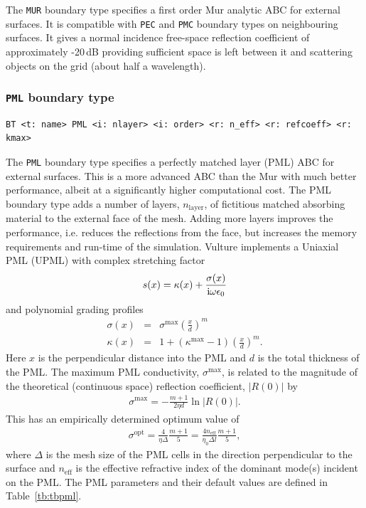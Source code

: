 \documentclass[onecolumn,a4paper]{article}
\numberwithin{equation}{section}
\begin{document}
The \texttt{MUR} boundary type specifies a first order Mur analytic ABC for external surfaces. It is compatible
with \texttt{PEC} and \texttt{PMC} boundary types on neighbouring surfaces. It gives a normal incidence 
free-space reflection coefficient of approximately -20\,dB providing sufficient space is left between
it and scattering objects on the grid (about half a wavelength).

\subsubsection{\texttt{PML} boundary type}

\begin{verbatim}
BT <t: name> PML <i: nlayer> <i: order> <r: n_eff> <r: refcoeff> <r: kmax>
\end{verbatim}

The \texttt{PML} boundary type specifies a perfectly matched layer (PML) ABC for external surfaces.
This is a more advanced ABC than the Mur with much better performance, albeit at a significantly 
higher computational cost. The PML boundary
type adds a number of layers, $n_\mathrm{layer}$, of fictitious matched absorbing material to the 
external face of the mesh. Adding more layers improves the performance, i.e. reduces the 
reflections from the face, but increases the memory requirements and run-time of the simulation.  
Vulture implements a Uniaxial PML (UPML) with complex stretching factor~\cite{vultimp}
\begin{eqnarray}
s(x) = \kappa(x) + \frac{\sigma (x)}{\mathrm{i} \omega \epsilon_0}
\end{eqnarray}
and polynomial grading profiles
\begin{eqnarray}
\sigma(x) &=& \sigma^{\mathrm{max}} \left(\frac{x}{d}\right)^m \\
\kappa(x) &=& 1 + (\kappa^{\mathrm{max}}-1) \left( \frac{x}{d} \right)^m.
\end{eqnarray}
Here $x$ is the perpendicular distance into the PML and $d$ is the total thickness of
the PML. The maximum PML conductivity, $\sigma^{\mathrm{max}}$, is related to the magnitude of
the theoretical (continuous space) reflection coefficient, $|R(0)|$ by 
\begin{eqnarray}
\sigma^{\mathrm{max}} = -\frac{m+1}{2 \eta d} \ln \left| R(0) \right|.
\end{eqnarray}
This has an empirically determined optimum value of 
\begin{eqnarray}
\sigma^{\mathrm{opt}} = \frac{4}{\eta \Delta} \frac{m+1}{5} = \frac{4 n_\mathrm{eff}}{\eta_0 \Delta l} \frac{m+1}{5},
\end{eqnarray}
where $\Delta$ is the mesh size of the PML cells in the direction 
perpendicular to the surface and $n_\mathrm{eff}$ is the effective refractive index
of the dominant mode(s) incident on the PML. The PML parameters and their
default values are defined in Table~\ref{tb:tbpml}. 
\end{document}
